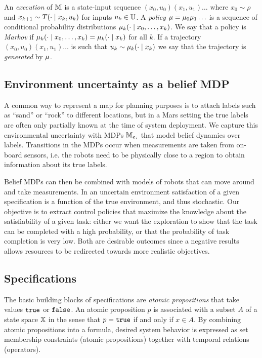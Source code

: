 \documentclass[conference]{IEEEtran}
\begin{document}
An \emph{execution} of $\mathbb{M}$ is a state-input sequence $(x_0, u_0)(x_1, u_1)\ldots$ where $x_0 \sim \rho$ and $x_{k+1} \sim T(\cdot \mid x_k, u_k)$ for inputs $u_k \in \mathbb{U}$. A \emph{policy} $\mu = \mu_0 \mu_1 \ldots$ is a sequence of conditional probability distributions $\mu_k( \cdot \mid x_0, \ldots, x_{k})$. We say that a policy is \emph{Markov} if $\mu_k( \cdot \mid x_0, \ldots, x_{k}) = \mu_k( \cdot \mid x_{k})$ for all $k$. If a trajectory $(x_0, u_0)(x_1, u_1)\ldots$ is such that $u_k \sim \mu_k ( \cdot \mid x_{k})$ we say that the trajectory is \emph{generated} by $\mu$.


\subsection{Environment uncertainty as a belief MDP}

A common way to represent a map for planning purposes is to attach labels such as ``sand'' or ``rock'' to different locations, but in a Mars setting the true labels are often only partially known at the time of system deployment. We capture this environmental uncertainty with MDPs $\mathbb{M}_{e_i}$ that model belief dynamics over labels. Transitions in the MDPs occur when measurements are taken from on-board sensors, i.e. the robots need to be physically close to a region to obtain information about its true labels. 


Belief MDPs can then be combined with models of robots that can move around and take measurements. In an uncertain environment satisfaction of a given specification is a function of the true environment, and thus stochastic. Our objective is to extract control policies that maximize the knowledge about the satisfiability of a given task: either we want the exploration to show that the task can be completed with a high probability, or that the probability of task completion is very low. Both are desirable outcomes since a negative results allows resources to be redirected towards more realistic objectives.  

\subsection{Specifications}

The basic building blocks of specifications are \emph{atomic propositions} that take values $\texttt{true}$ or $\texttt{false}$. An atomic proposition $p$ is associated with a subset $A$ of a state space $\mathbb{X}$ in the sense that $p = \texttt{true}$ if and only if $x \in A$. By combining atomic propositions into a formula, desired system behavior is expressed as set membership constraints (atomic propositions) together with temporal relations (operators).
\end{document}
